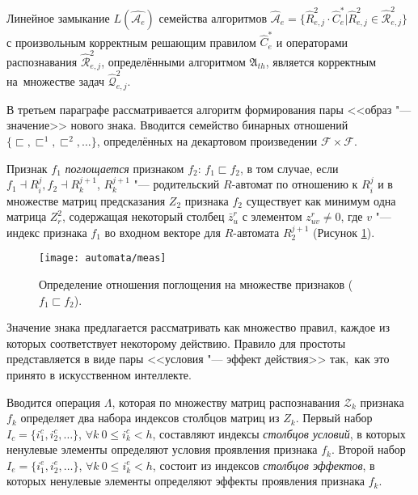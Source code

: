 \begin{Theorem}\label{th:hier_correct}
	Линейное замыкание $L(\hat{\mathcal A_e})$ семейства алгоритмов $\hat{\mathcal A}_e=\{\hat R_{e,j}^2\cdot\hat C_e^*|\hat R_{e,j}^2\in\hat{\mathcal R}_{e,j}^2\}$ с произвольным корректным решающим правилом $\hat C_e^*$ и операторами распознавания $\hat{\mathcal R}_{e,j}^2$, определёнными алгоритмом $\mathfrak A_{th}$, является корректным на~множестве задач $\hat{\mathcal Q}_{e,j}^2$.
\end{Theorem}

В третьем параграфе рассматривается алгоритм формирования пары <<образ "--- значение>> нового знака. Вводится семейство бинарных отношений $\{\sqsubset,\sqsubset^1,\sqsubset^2,\dots\}$, определённых на декартовом произведении $\mathcal F\times\mathcal F$. 

Признак $f_1$ \textit{поглощается} признаком $f_2$: $f_1\sqsubset f_2$, в том случае, если $f_1\dashv R_i^j, f_2\dashv R_k^{j+1}$, $R_k^{j+1}$ "--- родительский $R$-автомат по отношению к $R_i^j$ и в множестве матриц предсказания $Z_2$ признака $f_2$ существует как минимум одна матрица $Z_r^2$, содержащая некоторый столбец $\bar z_u^r$ с элементом $z_{uv}^r\not=0$, где $v$ "--- индекс признака $f_1$ во входном векторе для $R$-автомата $R_2^{j+1}$ (Рисунок \ref{fig:rb_measure}).

\begin{figure}[h]
	\centering
	\texttt{[image: automata/meas]}
	\caption{Определение отношения поглощения на множестве признаков ($f_1\sqsubset f_2$).}
	\label{fig:rb_measure}
\end{figure}

Значение знака предлагается рассматривать как множество правил, каждое из которых соответствует некоторому действию. Правило для простоты представляется в виде пары <<условия "--- эффект действия>> так,~как это принято в искусственном интеллекте. 

Вводится операция $\Lambda$, которая по множеству матриц распознавания $\mathcal Z_k$ признака $f_k$ определяет два набора индексов столбцов матриц из $Z_k$. Первый набор $I_c=\{i_1^c,i_2^c,\dots\}$, $\forall k\ 0\leqslant i_k^c < h$, составляют индексы \textit{столбцов условий}, в которых ненулевые элементы определяют условия проявления признака $f_k$. Второй набор $I_e=\{i_1^e,i_2^e,\dots\}$, $\forall k\ 0\leqslant i_k^e < h$, состоит из индексов  \textit{столбцов эффектов}, в которых ненулевые элементы определяют эффекты проявления признака $f_k$. 

